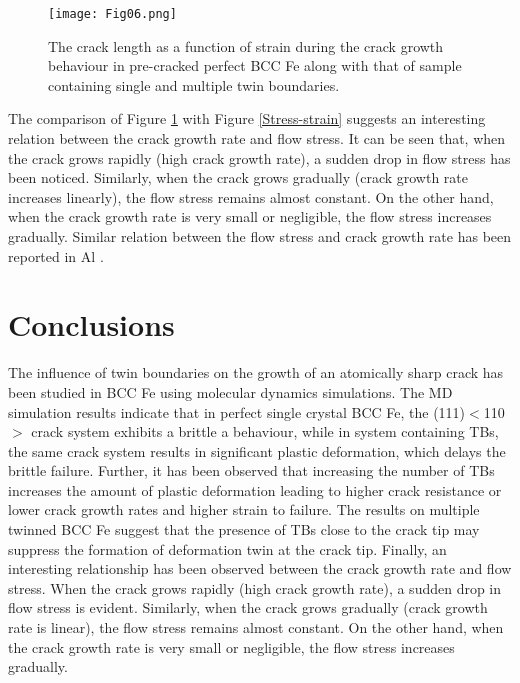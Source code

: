 \documentclass[smallextended]{svjour3}       %
\renewcommand\hl[1]{#1}
\begin{document}
\begin{figure}[h]
\centering
\texttt{[image: Fig06.png]}
\caption {\small The crack length as a function of strain during the crack growth behaviour in pre-cracked perfect BCC Fe along 
with that of sample containing single and multiple twin boundaries.}
\label{Crack-length}
\end{figure}

\hl{The comparison of Figure \mbox{\ref{Crack-length}} with Figure \mbox{\ref{Stress-strain}} suggests} an interesting relation 
between the crack growth rate and flow stress. \hl{It can be seen that}, when the crack grows rapidly (high crack growth rate), 
a sudden drop in flow stress has been noticed. Similarly, when the crack grows gradually (crack growth rate increases linearly), 
the flow stress remains almost constant. On the other hand, when the crack growth rate is very small or negligible, the flow 
stress increases gradually. Similar relation between the flow stress and crack growth rate has been reported in Al \cite{fang2016molecular}.

\section{Conclusions}

The influence of twin boundaries on the growth of an atomically sharp crack has been studied in BCC Fe using molecular 
dynamics simulations. The MD simulation results indicate that in perfect single crystal BCC Fe, the (111)$<$110$>$ crack 
system exhibits a brittle a behaviour, while in system containing TBs, the same crack system results in significant plastic 
deformation, which delays the brittle failure. Further, it has been observed that increasing the number of TBs increases 
the amount of plastic deformation leading to higher crack resistance or lower crack growth rates and higher strain to 
failure. The results on multiple twinned BCC Fe suggest that the presence of TBs close to the crack tip may suppress the 
formation of deformation twin at the crack tip. Finally, an interesting relationship has been observed between the crack 
growth rate and flow stress. When the crack grows rapidly (high crack growth rate), a sudden drop in flow stress is evident. 
Similarly, when the crack grows gradually (crack growth rate is linear), the flow stress remains almost constant. On the 
other hand, when the crack growth rate is very small or negligible, the flow stress increases gradually. 


\end{document}
